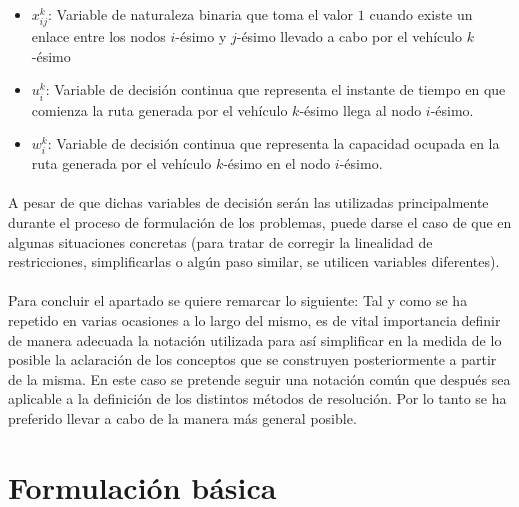 \documentclass{subfiles}
\begin{document}
        \begin{itemize}
          \item $x_{ij}^{k}$: Variable de naturaleza binaria que toma el valor $1$ cuando existe un enlace entre los nodos $i$-ésimo y $j$-ésimo llevado a cabo por el vehículo $k$-ésimo
          \item $u_{i}^{k}$: Variable de decisión continua que representa el instante de tiempo en que comienza la ruta generada por el vehículo $k$-ésimo llega al nodo $i$-ésimo.
          \item $w_{i}^{k}$: Variable de decisión continua que representa la capacidad ocupada en la ruta generada por el vehículo $k$-ésimo en el nodo $i$-ésimo.
        \end{itemize}

        \paragraph{}
        A pesar de que dichas variables de decisión serán las utilizadas principalmente durante el proceso de formulación de los problemas, puede darse el caso de que en algunas situaciones concretas (para tratar de corregir la linealidad de restricciones, simplificarlas o algún paso similar, se utilicen variables diferentes).

      \paragraph{}
      Para concluir el apartado se quiere remarcar lo siguiente: Tal y como se ha repetido en varias ocasiones a lo largo del mismo, es de vital importancia definir de manera adecuada la notación utilizada para así simplificar en la medida de lo posible la aclaración de los conceptos que se construyen posteriormente a partir de la misma. En este caso se pretende seguir una notación común que después sea aplicable a la definición de los distintos métodos de resolución. Por lo tanto se ha preferido llevar a cabo de la manera más general posible.

    \section{Formulación básica}
    \label{sec:formulation_basic_formulation}
\end{document}
